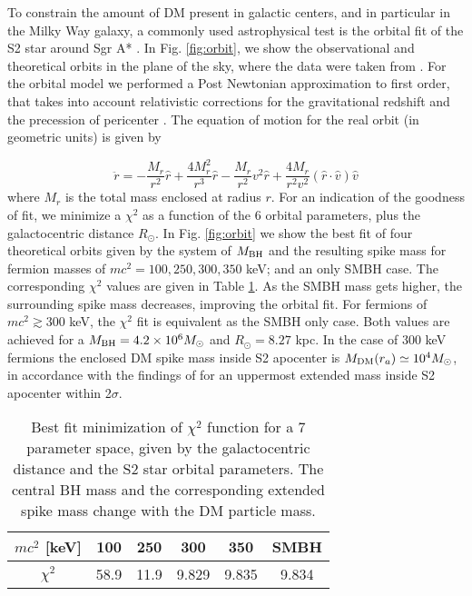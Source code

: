 \documentclass[baaa]{baaa}
\begin{document}
To constrain the amount of DM present in galactic centers, and in particular in the Milky Way galaxy, a commonly used astrophysical test is the orbital fit of the S2 star around Sgr A* \citep{2018A&A...619A..46L,GRAVITY:2021xju,GRAVITY:2023cjt}. 
In Fig. \ref{fig:orbit}, we show the observational and theoretical orbits in the plane of the sky, where the data were taken from \cite{do2019relativistic}.
For the orbital model we performed a Post Newtonian approximation to first order, that takes into account relativistic corrections for the gravitational redshift and the precession of pericenter \citep{2008ApJ...674L..25W}. The equation of motion for the real orbit (in geometric units) is given by

\begin{equation}
    \ddot{r}=-\frac{M_r}{r^2}\hat{r}+\frac{4M_r^2}{r^3}\hat{r}-\frac{M_r}{r^2}v^2\hat{r}+\frac{4M_r}{r^2v^2}(\hat{r}\cdot \hat{v})\hat{v}
\end{equation}
%
where $M_r$ is the total mass enclosed at radius $r$. For an indication of the goodness of fit, we minimize a $\chi^2$ as a function of the 6 orbital parameters, plus the galactocentric distance $R_\odot$. In Fig. \ref{fig:orbit} we show the best fit of four theoretical orbits given by the system of $M_{\rm BH}$ and the resulting spike mass for fermion masses of $mc^2=100, 250,300,350$ keV; and an only SMBH case. 
The corresponding $\chi^2$ values are given in Table \ref{tab:chi2}. As the SMBH mass gets higher, the surrounding spike mass decreases, improving the orbital fit. For fermions of $mc^2 \gtrsim 300$ keV, the $\chi^2$ fit is equivalent as the SMBH only case. Both values are achieved for a $M_{\rm BH}=4.2\times 10^6 M_\odot$ and $R_\odot = 8.27$ kpc. In the case of 300 keV fermions the enclosed DM spike mass inside S2 apocenter is $M_{\rm DM}(r_a)\simeq 10^4 M_\odot$, in accordance with the findings of \cite{do2019relativistic} for an uppermost extended mass inside S2 apocenter within 2$\sigma$.

\begin{table}[t]
    \centering
    \begin{tabular}{|c|c|c|c|c|c|} \hline
     $mc^2$ [keV] & 100 & 250 & 300 & 350 & SMBH \\ \hline
     $\chi^2$ & 58.9 & 11.9 & 9.829 & 9.835 & 9.834 \\ \hline
    \end{tabular}
    \caption{Best fit minimization of $\chi^2$ function for a 7 parameter space, given by the galactocentric distance and the S2 star orbital parameters. The central BH mass and the corresponding extended spike mass change with the DM particle mass.}
    \label{tab:chi2}
\end{table}
\end{document}
